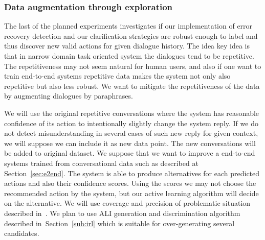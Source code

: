 \documentclass[11pt]{article}
\begin{document}
\subsubsection*{Data augmentation through exploration}
The last of the planned experiments investigates if our implementation of error recovery detection and our clarification strategies are robust enough to label and thus discover new valid actions for given dialogue history.
The idea key idea is that in narrow domain task oriented system the dialogues tend to be repetitive.
The repetitiveness may not seem natural for human users, and also if one want to train end-to-end systems repetitive data makes the system not only also repetitive but also less robust. 
We want to mitigate the repetitiveness of the data by augmenting dialogues by paraphrases.

We will use the original repetitive conversations where the system has reasonable confidence of its action to intentionally slightly change the system reply.
If we do not detect misunderstanding in several cases of such new reply for given context, we will suppose we can include it as new data point. 
The new conversations will be added to original dataset.
We suppose that we want to improve a end-to-end systems trained from conversational data such as described at Section~\ref{sec:e2end}.
The system is able to produce alternatives for each predicted actions and also their confidence scores.
Using the scores we may not choose the recommended action by the system, but our active learning algorithm will decide on the alternative.
We will use coverage and precision of problematic situation described in~\cite{meena_datadriven_2016}.
We plan to use ALI generation and discrimination algorithm described in~Section~\ref{sub:irl} which is suitable for over-generating several candidates.
\end{document}
